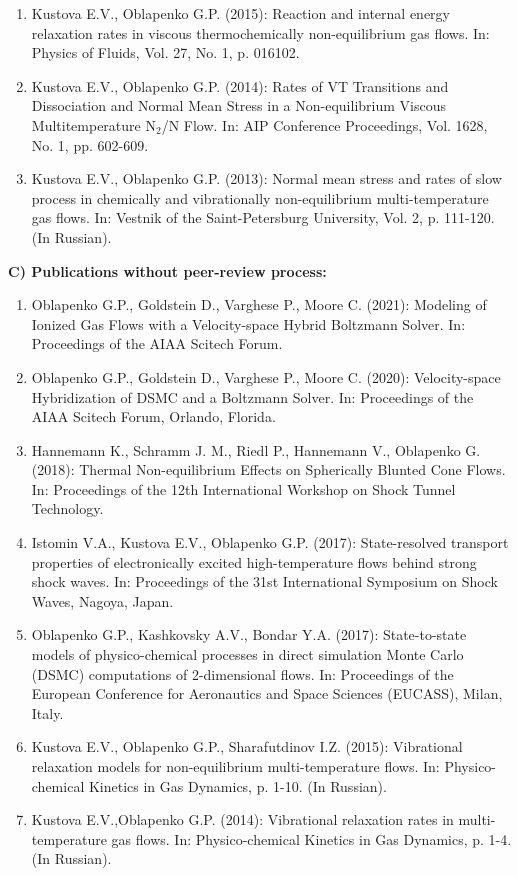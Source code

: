 \documentclass{resume} %
\begin{document}
\begin{enumerate}
\item {Kustova E.V., {Oblapenko G.P.}} (2015): Reaction and internal energy relaxation rates in viscous thermochemically non-equilibrium gas flows. In: Physics of Fluids, Vol. 27, No. 1, p. 016102.

\item  {Kustova E.V., {Oblapenko G.P.}} (2014): Rates of VT Transitions and Dissociation and Normal Mean Stress in a Non-equilibrium Viscous Multitemperature N$_2$/N Flow. In: AIP Conference Proceedings, Vol. 1628, No. 1, pp. 602-609.

\item  {Kustova E.V., {Oblapenko G.P.}} (2013):
{Normal mean stress and rates of slow process in chemically and vibrationally non-equilibrium multi-temperature gas flows.} In: Vestnik of the Saint-Petersburg University, Vol. 2, p. 111-120. (In Russian).
\end{enumerate}


{\bf C) Publications without peer-review process:}
\begin{enumerate}

    \item {Oblapenko G.P., Goldstein D., Varghese P., Moore C.} (2021): Modeling of Ionized Gas Flows with a Velocity-space Hybrid Boltzmann Solver. In: Proceedings of the AIAA Scitech Forum.
    
    \item {Oblapenko G.P., Goldstein D., Varghese P., Moore C.} (2020): Velocity-space Hybridization of DSMC and a Boltzmann Solver. In: Proceedings of the AIAA Scitech Forum, Orlando, Florida.

    \item {Hannemann K., Schramm J. M., Riedl P., Hannemann V., { Oblapenko G.}} (2018): Thermal Non-equilibrium Effects on Spherically Blunted Cone Flows. In: Proceedings of the 12th International Workshop on Shock Tunnel Technology.
    
    \item Istomin V.A., Kustova E.V., {Oblapenko G.P.} (2017): State-resolved transport properties of electronically excited high-temperature flows behind strong shock waves. In: Proceedings of the 31st International Symposium on Shock Waves, Nagoya, Japan.
    
    \item {{Oblapenko G.P.}, Kashkovsky A.V., Bondar Y.A.} (2017): State-to-state models of physico-chemical processes in direct simulation Monte Carlo (DSMC) computations of 2-dimensional flows. In: Proceedings of the European Conference for Aeronautics and Space Sciences (EUCASS), Milan, Italy.

    \item  {Kustova E.V., {Oblapenko G.P.}, Sharafutdinov I.Z.} (2015):  {Vibrational relaxation models for non-equilibrium multi-temperature flows}. In: Physico-chemical Kinetics in Gas Dynamics, p. 1-10. (In Russian).

    \item  {Kustova E.V.,{Oblapenko G.P.}} (2014): {Vibrational relaxation rates in multi-temperature gas flows.} In: Physico-chemical Kinetics in Gas Dynamics, p. 1-4. (In Russian).
\end{enumerate}
\end{document}
